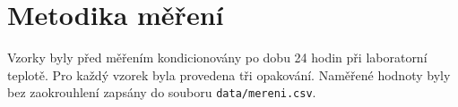 \section{Metodika měření}

Vzorky byly před měřením kondicionovány po dobu 24 hodin při laboratorní teplotě.
Pro každý vzorek byla provedena tři opakování. Naměřené hodnoty byly bez
zaokrouhlení zapsány do souboru \texttt{data/mereni.csv}.
